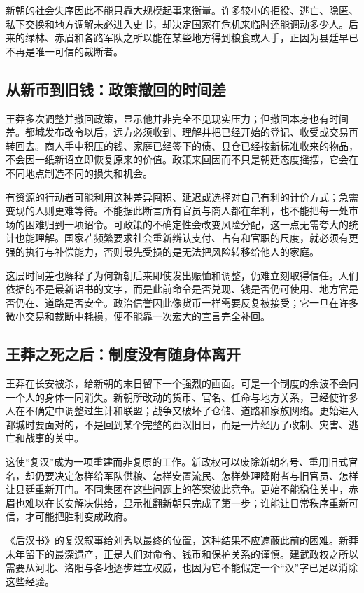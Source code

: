 新朝的社会失序因此不能只靠大规模起事来衡量。许多较小的拒役、逃亡、隐匿、私下交换和地方调解未必进入史书，却决定国家在危机来临时还能调动多少人。后来的绿林、赤眉和各路军队之所以能在某些地方得到粮食或人手，正因为县廷早已不再是唯一可信的裁断者。

\subsection{从新币到旧钱：政策撤回的时间差}

王莽多次调整并撤回政策，显示他并非完全不见现实压力；但撤回本身也有时间差。都城发布改令以后，远方必须收到、理解并把已经开始的登记、收受或交易再转回去。商人手中积压的钱、家庭已经签下的债、县仓已经按新标准收来的物品，不会因一纸新诏立即恢复原来的价值。政策来回因而不只是朝廷态度摇摆，它会在不同地点制造不同的损失和机会。

有资源的行动者可能利用这种差异囤积、延迟或选择对自己有利的计价方式；急需变现的人则更难等待。不能据此断言所有官员与商人都在牟利，也不能把每一处市场的困难归到一项诏令。可政策的不确定性会改变风险分配，这一点无需夸大的统计也能理解。国家若频繁要求社会重新辨认支付、占有和官职的尺度，就必须有更强的执行与补偿能力，否则最先受损的是无法把风险转移给他人的家庭。

这层时间差也解释了为何新朝后来即使发出赈恤和调整，仍难立刻取得信任。人们依据的不是最新诏书的文字，而是此前命令是否兑现、钱是否仍可使用、地方官是否仍在、道路是否安全。政治信誉因此像货币一样需要反复被接受；它一旦在许多微小交易和裁断中耗损，便不能靠一次宏大的宣言完全补回。

\subsection{王莽之死之后：制度没有随身体离开}

王莽在长安被杀，给新朝的末日留下一个强烈的画面。可是一个制度的余波不会同一个人的身体一同消失。新朝所改动的货币、官名、任命与地方关系，已经使许多人在不确定中调整过生计和联盟；战争又破坏了仓储、道路和家族网络。更始进入都城时要面对的，不是回到某个完整的西汉旧日，而是一片经历了改制、灾害、逃亡和战事的关中。

这使“复汉”成为一项重建而非复原的工作。新政权可以废除新朝名号、重用旧式官名，却仍要决定怎样给军队供粮、怎样安置流民、怎样处理降附者与旧官员、怎样让县廷重新开门。不同集团在这些问题上的答案彼此竞争。更始不能稳住关中，赤眉也难以在长安解决供给，显示推翻新朝只完成了第一步；谁能让日常秩序重新可信，才可能把胜利变成政府。

《后汉书》的复汉叙事给刘秀以最终的位置，这种结果不应遮蔽此前的困难。新莽末年留下的最深遗产，正是人们对命令、钱币和保护关系的谨慎。建武政权之所以需要从河北、洛阳与各地逐步建立权威，也因为它不能假定一个“汉”字已足以消除这些经验。

